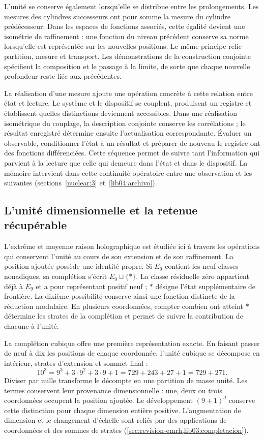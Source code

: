 L’unité se conserve également lorsqu’elle se distribue entre les prolongements.
Les mesures des cylindres successeurs ont pour somme la mesure du cylindre prédécesseur.
Dans les espaces de fonctions associés, cette égalité devient
une isométrie de raffinement : une fonction du niveau précédent conserve
sa norme lorsqu’elle est représentée sur les nouvelles positions. Le même
principe relie partition, mesure et transport. Les démonstrations
de la construction conjointe spécifient la composition et le passage à la
limite, de sorte que chaque nouvelle profondeur reste liée aux
précédentes.

La réalisation d’une mesure ajoute une opération concrète à cette relation
entre état et lecture. Le système et le dispositif se couplent, produisent
un registre et établissent quelles distinctions deviennent accessibles. Dans une
réalisation isométrique du couplage, la description conjointe conserve
les corrélations ; le résultat enregistré détermine ensuite
l’actualisation correspondante. Évaluer un observable, conditionner
l’état à un résultat et préparer de nouveau le registre ont des fonctions
différenciées. Cette séquence permet de suivre tant l’information qui
parvient à la lecture que celle qui demeure dans l’état et dans le dispositif.
La mémoire intervient dans cette continuité opératoire entre une observation
et les suivantes (sections~\ref{nuclear:3} et~\ref{lib04:archivo}).

\subsection*{L’unité dimensionnelle et la retenue récupérable}
\label{libnar:unidad}

L’extrême et moyenne raison holographique est étudiée ici à travers les
opérations qui conservent l’unité au cours de son extension et de son
raffinement. La position ajoutée possède une identité propre. Si
\(E_9\) contient les neuf classes nonadiques, sa complétion s’écrit
\(E_9\sqcup\{\ast\}\). La classe résiduelle zéro appartient déjà à
\(E_9\) et a pour représentant positif neuf ; \(\ast\) désigne
l’état supplémentaire de frontière. La dixième possibilité conserve ainsi une
fonction distincte de la réduction modulaire. En plusieurs coordonnées, compter
combien ont atteint \(\ast\) détermine les strates de la complétion
et permet de suivre la contribution de chacune à l’unité.

La complétion cubique offre une première représentation exacte. En faisant passer de neuf à dix les positions de chaque coordonnée, l'unité cubique se décompose en intérieur, strates d'extension et sommet final :
\[
 10^3=9^3+3\cdot9^2+3\cdot9+1
     =729+243+27+1=729+271.
\]
Diviser par mille transforme le décompte en une partition de masse unité. Les termes conservent leur provenance dimensionnelle : une, deux ou trois coordonnées occupent la position ajoutée. Le développement \((9+1)^d\) conserve cette distinction pour chaque dimension entière positive. L'augmentation de dimension et le changement d'échelle sont reliés par des applications de coordonnées et des sommes de strates (\cref{sec:revision-emrh,lib03:completacion}).

